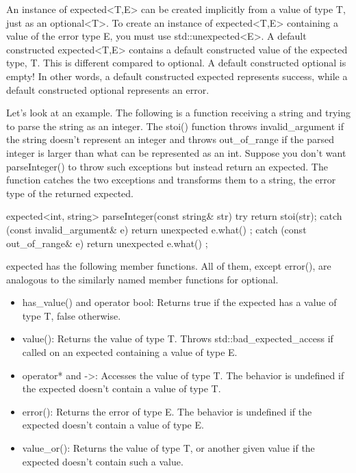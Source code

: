 An instance of expected<T,E> can be created implicitly from a value of type T, just as an optional<T>. To create an instance of expected<T,E> containing a value of the error type E, you must use std::unexpected<E>. A default constructed expected<T,E> contains a default constructed value of the expected type, T. This is different compared to optional. A default constructed optional is empty! In other words, a default constructed expected represents success, while a default constructed optional represents an error.

Let’s look at an example. The following is a function receiving a string and trying to parse the string as an integer. The stoi() function throws invalid\_argument if the string doesn’t represent an integer and throws out\_of\_range if the parsed integer is larger than what can be represented as an int. Suppose you don’t want parseInteger() to throw such exceptions but instead return an expected. The function catches the two exceptions and transforms them to a string, the error type of the returned expected.

\begin{cpp}
expected<int, string> parseInteger(const string& str)
{
    try { return stoi(str); }
    catch (const invalid_argument& e) { return unexpected { e.what() }; }
    catch (const out_of_range& e) { return unexpected { e.what() }; }
}
\end{cpp}

expected has the following member functions. All of them, except error(), are analogous to the similarly named member functions for optional.

\begin{itemize}
\item
has\_value() and operator bool: Returns true if the expected has a value of type T, false otherwise.

\item
value(): Returns the value of type T. Throws std::bad\_expected\_access if called on an expected containing a value of type E.

\item
operator* and ->: Accesses the value of type T. The behavior is undefined if the expected doesn’t contain a value of type T.

\item
error(): Returns the error of type E. The behavior is undefined if the expected doesn’t contain a value of type E.

\item
value\_or(): Returns the value of type T, or another given value if the expected doesn’t contain such a value.
\end{itemize}

